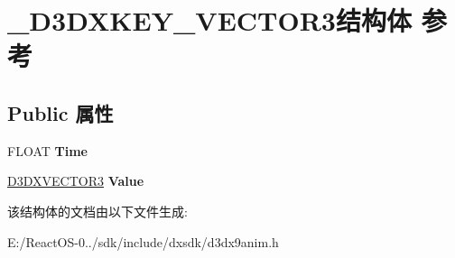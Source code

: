 \hypertarget{struct___d3_d_x_k_e_y___v_e_c_t_o_r3}{}\section{\+\_\+\+D3\+D\+X\+K\+E\+Y\+\_\+\+V\+E\+C\+T\+O\+R3结构体 参考}
\label{struct___d3_d_x_k_e_y___v_e_c_t_o_r3}
\subsection*{Public 属性}
\begin{DoxyCompactItemize}
\item 
\mbox{\label{struct___d3_d_x_k_e_y___v_e_c_t_o_r3_afd656d2b3c739deaef83d05bafeab40a}} 
F\+L\+O\+AT {\bfseries Time}
\item 
\mbox{\label{struct___d3_d_x_k_e_y___v_e_c_t_o_r3_a11dc78f2a1a0511ad757102a1fa0fb56}} 
\hyperlink{struct___d3_d_v_e_c_t_o_r}{D3\+D\+X\+V\+E\+C\+T\+O\+R3} {\bfseries Value}
\end{DoxyCompactItemize}


该结构体的文档由以下文件生成\+:\begin{DoxyCompactItemize}
\item 
E\+:/\+React\+O\+S-\/0../sdk/include/dxsdk/d3dx9anim.\+h\end{DoxyCompactItemize}
